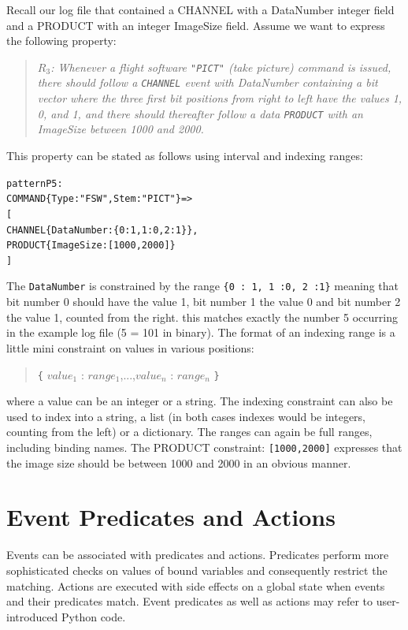 \documentclass{report}
\newenvironment{code}[1] %
{
\vspace{0.5cm}
\begin{center}
\begin{Sbox}
\begin{minipage}{11cm}
\begin{alltt}
{\bf\em #1}
}
{
\end{alltt}
\end{minipage}
\end{Sbox}
\setlength{\fboxsep}{8pt}
\fbox{\TheSbox}
\end{center}
\vspace{0.5cm}
}
\begin{document}
Recall our log file that contained a CHANNEL with a DataNumber integer field and a PRODUCT with an integer ImageSize field. Assume we want to express the following property:

\begin{quote}
  {\em $R_3$: Whenever a flight software {\tt "PICT"} (take picture) command is issued, there should follow
	a {\tt CHANNEL} event with DataNumber containing a bit vector where the three first bit positions from right to left
	have the values 1, 0, and 1, and there should thereafter follow a data {\tt PRODUCT} 
	    with an 	ImageSize between 1000 and 2000.}
\end{quote}

\noindent This property can be stated as follows using interval and indexing ranges:

\begin{code}{}
pattern P5 :
    COMMAND\{Type: "FSW", Stem: "PICT"\} => 
    [
       CHANNEL\{DataNumber : \{0 : 1, 1 :0, 2 :1\}\}, 
       PRODUCT\{ImageSize : [1000,2000]\}
    ]
\end{code}
 
\noindent The {\tt DataNumber} is constrained by the range {\tt \{0 : 1, 1 :0, 2 :1\}} meaning
that bit number 0 should have the value 1, bit number 1 the value 0 and bit number 2 the value 1,
counted from the right. this matches exactly the number 5 occurring in the example log file
(5 = 101 in binary). The format
of an indexing range is a little mini constraint on values in various positions:

\begin{quote}
  {\tt \{} $value_1$ : $range_1$,...,$value_n$ : $range_n$ {\tt \}}
\end{quote}

\noindent where a value can be an integer or a string. 
The indexing constraint can also be used to index into a string, a list (in both cases indexes would be integers, 
counting from the left) or a dictionary.  
The ranges can again be full ranges, including binding names.
The PRODUCT constraint: {\tt [1000,2000]} expresses that the image size
should be between 1000 and 2000 in an obvious manner.


\section{Event Predicates and Actions}

Events can be associated with predicates and actions. Predicates
perform more sophisticated checks on values
of bound variables and consequently restrict the matching. 
Actions are executed with side effects on a global state 
when events and their predicates match. Event predicates as well
as actions may refer to user-introduced Python code.
 
\end{document}
